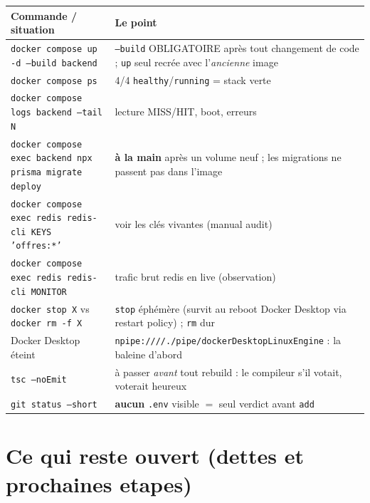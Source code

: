 \documentclass[11pt,a4paper]{article}
\begin{document}
\begin{center}
\begin{tabular}{@{}p{6.8cm}p{7.3cm}@{}}
\toprule
Commande / situation & Le point \\
\midrule
\texttt{docker compose up -d --build backend} &
\texttt{--build} OBLIGATOIRE après tout changement de code ; \texttt{up} seul recrée avec l'\emph{ancienne} image \\
\texttt{docker compose ps} &
4/4 \texttt{healthy}/\texttt{running} = stack verte \\
\texttt{docker compose logs backend --tail N} &
lecture MISS/HIT, boot, erreurs \\
\texttt{docker compose exec backend npx prisma migrate deploy} &
\textbf{à la main} après un volume neuf ; les migrations ne passent pas dans l'image \\
\texttt{docker compose exec redis redis-cli KEYS 'offres:*'} &
voir les clés vivantes (manual audit) \\
\texttt{docker compose exec redis redis-cli MONITOR} &
trafic brut redis en live (observation) \\
\texttt{docker stop X} vs \texttt{docker rm -f X} &
\texttt{stop} éphémère (survit au reboot Docker Desktop via restart policy) ; \texttt{rm} dur \\
Docker Desktop éteint &
\texttt{npipe:////./pipe/dockerDesktopLinuxEngine} : la baleine d'abord \\
\texttt{tsc --noEmit} &
à passer \emph{avant} tout rebuild : le compileur s'il votait, voterait heureux \\
\texttt{git status --short} &
\textbf{aucun} \texttt{.env} visible $=$ seul verdict avant \texttt{add} \\
\bottomrule
\end{tabular}
\end{center}

\section{Ce qui reste ouvert (dettes et prochaines etapes)}
\end{document}
